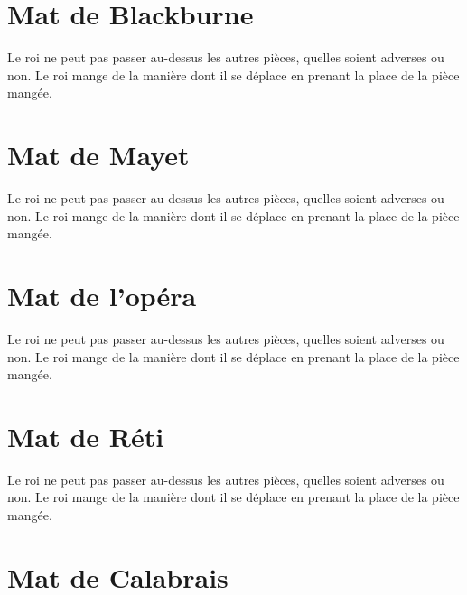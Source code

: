 \documentclass[a5paper,openany,twocolumn]{book}%
\begin{document}
 
\chapter{Mat de Blackburne}

Le roi ne peut pas passer au-dessus les autres pièces, quelles soient adverses ou non. Le roi mange de la manière dont il se déplace en prenant la place de la pièce mangée. 


\chapter{Mat de Mayet}

Le roi ne peut pas passer au-dessus les autres pièces, quelles soient adverses ou non. Le roi mange de la manière dont il se déplace en prenant la place de la pièce mangée. 

 
\chapter{Mat de l'opéra}

Le roi ne peut pas passer au-dessus les autres pièces, quelles soient adverses ou non. Le roi mange de la manière dont il se déplace en prenant la place de la pièce mangée. 


\chapter{Mat de Réti}

Le roi ne peut pas passer au-dessus les autres pièces, quelles soient adverses ou non. Le roi mange de la manière dont il se déplace en prenant la place de la pièce mangée. 

 
\chapter{Mat de Calabrais}
\end{document}
